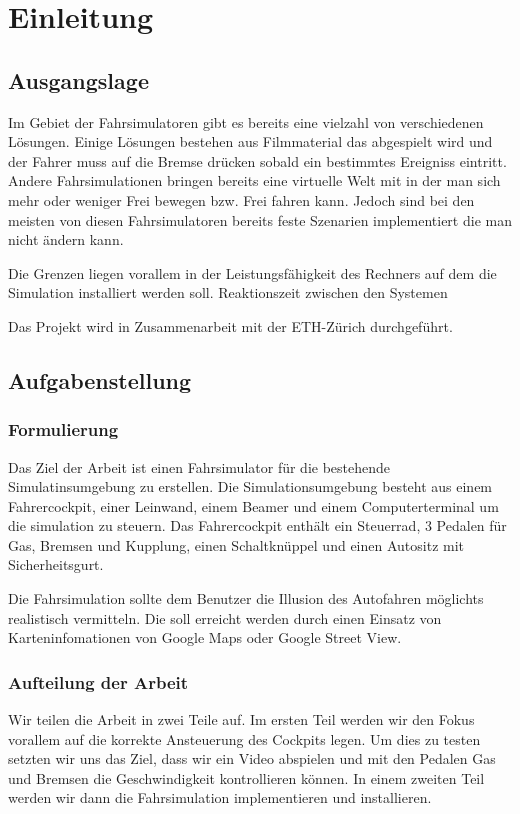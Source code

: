 \section{Einleitung}
\subsection{Ausgangslage}
Im Gebiet der Fahrsimulatoren gibt es bereits eine vielzahl von verschiedenen Lösungen. Einige Lösungen bestehen aus Filmmaterial das abgespielt wird und der Fahrer muss auf die Bremse drücken sobald ein bestimmtes Ereigniss eintritt. Andere Fahrsimulationen bringen bereits eine virtuelle Welt mit in der man sich mehr oder weniger Frei bewegen bzw. Frei fahren kann. Jedoch sind bei den meisten von diesen Fahrsimulatoren bereits feste Szenarien implementiert die man nicht ändern kann. 

Die Grenzen liegen vorallem in der Leistungsfähigkeit des Rechners auf dem die Simulation installiert werden soll. Reaktionszeit zwischen den Systemen

Das Projekt wird in Zusammenarbeit mit der ETH-Zürich durchgeführt. 


\subsection{Aufgabenstellung}
\subsubsection{Formulierung}
Das Ziel der Arbeit ist einen Fahrsimulator für die bestehende Simulatinsumgebung zu erstellen. Die Simulationsumgebung besteht aus einem Fahrercockpit, einer Leinwand, einem Beamer und einem Computerterminal um die simulation zu steuern. Das Fahrercockpit enthält ein Steuerrad, 3 Pedalen für Gas, Bremsen und Kupplung, einen Schaltknüppel und einen Autositz mit Sicherheitsgurt.

Die Fahrsimulation sollte dem Benutzer die Illusion des Autofahren möglichts realistisch vermitteln. Die soll erreicht werden durch einen Einsatz von Karteninfomationen von Google Maps oder Google Street View. 

\subsubsection{Aufteilung der Arbeit}
Wir teilen die Arbeit in zwei Teile auf. Im ersten Teil werden wir den Fokus vorallem auf die korrekte Ansteuerung des Cockpits legen. Um dies zu testen setzten wir uns das Ziel, dass wir ein Video abspielen und mit den Pedalen Gas und Bremsen die Geschwindigkeit kontrollieren können. In einem zweiten Teil werden wir dann die Fahrsimulation implementieren und installieren.